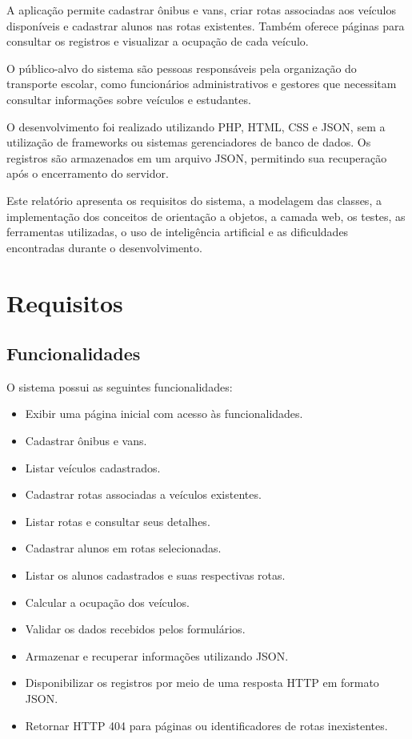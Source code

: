 \documentclass[12pt,a4paper]{article}
\begin{document}
A aplicação permite cadastrar ônibus e vans, criar rotas associadas aos veículos disponíveis e cadastrar alunos nas rotas existentes. Também oferece páginas para consultar os registros e visualizar a ocupação de cada veículo.

O público-alvo do sistema são pessoas responsáveis pela organização do transporte escolar, como funcionários administrativos e gestores que necessitam consultar informações sobre veículos e estudantes.

O desenvolvimento foi realizado utilizando PHP, HTML, CSS e JSON, sem a utilização de frameworks ou sistemas gerenciadores de banco de dados. Os registros são armazenados em um arquivo JSON, permitindo sua recuperação após o encerramento do servidor.

Este relatório apresenta os requisitos do sistema, a modelagem das classes, a implementação dos conceitos de orientação a objetos, a camada web, os testes, as ferramentas utilizadas, o uso de inteligência artificial e as dificuldades encontradas durante o desenvolvimento.

\section{Requisitos}

\subsection{Funcionalidades}

O sistema possui as seguintes funcionalidades:

\begin{itemize}
    \item Exibir uma página inicial com acesso às funcionalidades.
    \item Cadastrar ônibus e vans.
    \item Listar veículos cadastrados.
    \item Cadastrar rotas associadas a veículos existentes.
    \item Listar rotas e consultar seus detalhes.
    \item Cadastrar alunos em rotas selecionadas.
    \item Listar os alunos cadastrados e suas respectivas rotas.
    \item Calcular a ocupação dos veículos.
    \item Validar os dados recebidos pelos formulários.
    \item Armazenar e recuperar informações utilizando JSON.
    \item Disponibilizar os registros por meio de uma resposta HTTP em formato JSON.
    \item Retornar HTTP 404 para páginas ou identificadores de rotas inexistentes.
\end{itemize}
\end{document}
